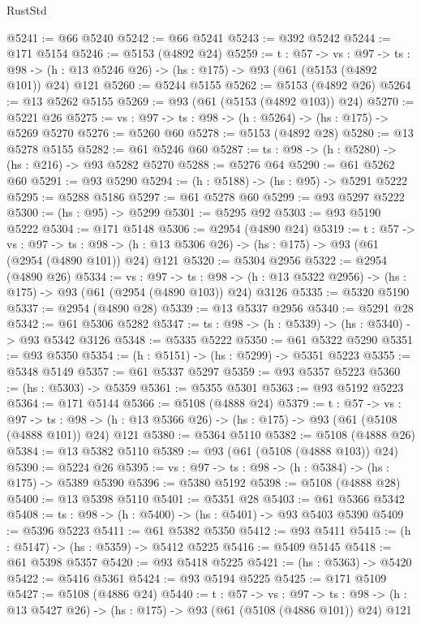 \begin{lexlean}{RustStd}
\begin{coremodule}
@5241 := @66 @5240
@5242 := @66 @5241
@5243 := @392 @5242
@5244 := @171 @5154
@5246 := @5153 (@4892 @24)
@5259 := {t : @57} ->
  {vs : @97} ->
  {ts : @98} -> (h : @13 @5246 @26) -> (hs : @175) -> @93 (@61 (@5153 (@4892 @101)) @24) @121
@5260 := @5244 @5155
@5262 := @5153 (@4892 @26)
@5264 := @13 @5262 @5155
@5269 := @93 (@61 (@5153 (@4892 @103)) @24)
@5270 := @5221 @26
@5275 := {vs : @97} -> {ts : @98} -> (h : @5264) -> (hs : @175) -> @5269 @5270
@5276 := @5260 @60
@5278 := @5153 (@4892 @28)
@5280 := @13 @5278 @5155
@5282 := @61 @5246 @60
@5287 := {ts : @98} -> (h : @5280) -> (hs : @216) -> @93 @5282 @5270
@5288 := @5276 @64
@5290 := @61 @5262 @60
@5291 := @93 @5290
@5294 := (h : @5188) -> (hs : @95) -> @5291 @5222
@5295 := @5288 @5186
@5297 := @61 @5278 @60
@5299 := @93 @5297 @5222
@5300 := (hs : @95) -> @5299
@5301 := @5295 @92
@5303 := @93 @5190 @5222
@5304 := @171 @5148
@5306 := @2954 (@4890 @24)
@5319 := {t : @57} ->
  {vs : @97} ->
  {ts : @98} -> (h : @13 @5306 @26) -> (hs : @175) -> @93 (@61 (@2954 (@4890 @101)) @24) @121
@5320 := @5304 @2956
@5322 := @2954 (@4890 @26)
@5334 := {vs : @97} ->
  {ts : @98} -> (h : @13 @5322 @2956) -> (hs : @175) -> @93 (@61 (@2954 (@4890 @103)) @24) @3126
@5335 := @5320 @5190
@5337 := @2954 (@4890 @28)
@5339 := @13 @5337 @2956
@5340 := @5291 @28
@5342 := @61 @5306 @5282
@5347 := {ts : @98} -> (h : @5339) -> (hs : @5340) -> @93 @5342 @3126
@5348 := @5335 @5222
@5350 := @61 @5322 @5290
@5351 := @93 @5350
@5354 := (h : @5151) -> (hs : @5299) -> @5351 @5223
@5355 := @5348 @5149
@5357 := @61 @5337 @5297
@5359 := @93 @5357 @5223
@5360 := (hs : @5303) -> @5359
@5361 := @5355 @5301
@5363 := @93 @5192 @5223
@5364 := @171 @5144
@5366 := @5108 (@4888 @24)
@5379 := {t : @57} ->
  {vs : @97} ->
  {ts : @98} -> (h : @13 @5366 @26) -> (hs : @175) -> @93 (@61 (@5108 (@4888 @101)) @24) @121
@5380 := @5364 @5110
@5382 := @5108 (@4888 @26)
@5384 := @13 @5382 @5110
@5389 := @93 (@61 (@5108 (@4888 @103)) @24)
@5390 := @5224 @26
@5395 := {vs : @97} -> {ts : @98} -> (h : @5384) -> (hs : @175) -> @5389 @5390
@5396 := @5380 @5192
@5398 := @5108 (@4888 @28)
@5400 := @13 @5398 @5110
@5401 := @5351 @28
@5403 := @61 @5366 @5342
@5408 := {ts : @98} -> (h : @5400) -> (hs : @5401) -> @93 @5403 @5390
@5409 := @5396 @5223
@5411 := @61 @5382 @5350
@5412 := @93 @5411
@5415 := (h : @5147) -> (hs : @5359) -> @5412 @5225
@5416 := @5409 @5145
@5418 := @61 @5398 @5357
@5420 := @93 @5418 @5225
@5421 := (hs : @5363) -> @5420
@5422 := @5416 @5361
@5424 := @93 @5194 @5225
@5425 := @171 @5109
@5427 := @5108 (@4886 @24)
@5440 := {t : @57} ->
  {vs : @97} ->
  {ts : @98} -> (h : @13 @5427 @26) -> (hs : @175) -> @93 (@61 (@5108 (@4886 @101)) @24) @121

\end{coremodule}
\end{lexlean}
